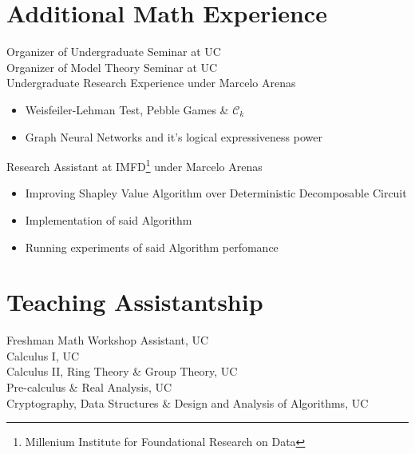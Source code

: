 \documentclass[11pt]{article} %
\begin{document}


\section*{Additional Math Experience}
Organizer of Undergraduate Seminar at UC\\
Organizer of Model Theory Seminar at UC\\
Undergraduate Research Experience under Marcelo Arenas
\begin{itemize}[itemsep=1pt,parsep=0pt,topsep=0pt]
    \item Weisfeiler-Lehman Test, Pebble Games \& \(\mathcal{C}_k\)
    \item Graph Neural Networks and it's logical expressiveness power
\end{itemize}
 Research Assistant at IMFD\footnote{Millenium Institute for Foundational Research on Data} under Marcelo Arenas
\begin{itemize}[itemsep=1pt, parsep=0pt, topsep=0pt]
    \item Improving Shapley Value Algorithm over Deterministic Decomposable Circuit
    \item Implementation of said Algorithm
    \item Running experiments of said Algorithm perfomance
\end{itemize}

\section*{Teaching Assistantship}

Freshman Math Workshop Assistant, UC\\ 
Calculus I, UC\\
Calculus II, Ring Theory \& Group Theory, UC\\
Pre-calculus \& Real Analysis, UC\\
Cryptography, Data Structures \& Design and Analysis of Algorithms, UC\\
\end{document}
